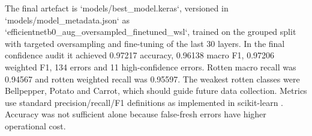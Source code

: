 \documentclass[11pt,a4paper]{article}
\renewcommand{\arraystretch}{1.08}
\begin{document}
\begin{table}[ht]
\centering
\caption{Computer-vision model comparison from the final confidence-audit notebook on the test set.}
\begingroup
\setlength{\tabcolsep}{5pt}
\renewcommand{\arraystretch}{1.32}
\footnotesize
{}
\endgroup
\end{table}

The final artefact is `models/best\_model.keras`, versioned in `models/model\_metadata.json` as `efficientnetb0\_aug\_oversampled\_finetuned\_wsl`, trained on the grouped split with targeted oversampling and fine-tuning of the last 30 layers. In the final confidence audit it achieved 0.97217 accuracy, 0.96138 macro F1, 0.97206 weighted F1, 134 errors and 11 high-confidence errors. Rotten macro recall was 0.94567 and rotten weighted recall was 0.95597. The weakest rotten classes were Bellpepper, Potato and Carrot, which should guide future data collection. Metrics use standard precision/recall/F1 definitions as implemented in scikit-learn \citep{sklearnmetrics2026}. Accuracy was not sufficient alone because false-fresh errors have higher operational cost.
\end{document}
